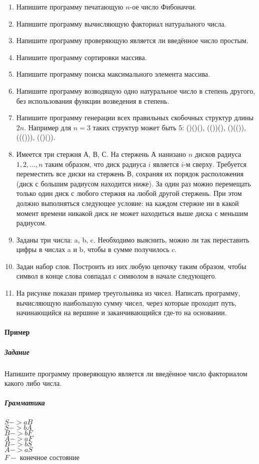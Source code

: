\documentclass[a4paper,12pt]{article}
\begin{document}
\begin{enumerate}
	\item Напишите программу печатающую $n$-ое число Фибоначчи.
	\item Напишите программу вычисляющую факториал натурального числа.
	\item Напишите программу проверяющую является ли введённое число простым.
	\item Напишите программу сортировки массива.
	\item Напишите программу поиска максимального элемента массива.
	\item Напишите программу возводящую одно натуральное число в степень другого, без использования функции возведения в степень.
	\item Напишите программу генерации всех правильных скобочных структур длины $2n$. Например для $n=3$ таких структур может быть 5: ()()(), (())(), ()(()), ((())), (()()).
	\item Имеется три стержня А, В, С. На стержень А нанизано $n$ дисков радиуса $1, 2,..., n$ таким образом, что диск радиуса $i$ является $i$-м сверху. Требуется переместить все диски на стержень В, сохраняя их порядок расположения (диск с большим радиусом находится ниже). За один раз можно перемещать только один диск с любого стержня на любой другой стержень. При этом должно выполняться следующее условие: на каждом стержне ни в какой момент времени никакой диск не может находиться выше диска с меньшим радиусом. 
	\item Заданы три числа: a, b, c. Необходимо выяснить, можно ли так переставить цифры в числах a и b, чтобы в сумме получилось c.
	\item Задан набор слов. Построить из них любую цепочку таким образом, чтобы символ в конце слова совпадал с символом в начале следующего.
	\item На рисунке показан пример треугольника из чисел. Написать программу, вычисляющую наибольшую сумму чисел, через которые проходит путь, начинающийся на вершине и заканчивающийся где-то на основании. 	
		
\end{enumerate}

\paragraph{Пример}
\subparagraph{Задание}
Напишите программу проверяющую является ли введённое число факториалом какого либо числа.
\subparagraph{Грамматика}
$S -> aB$\\
$S -> bA$\\
$B -> bF$\\
$A -> aF$\\
$B -> bS$\\
$A -> aS$\\
$F -$ конечное состояние\\
\end{document}
